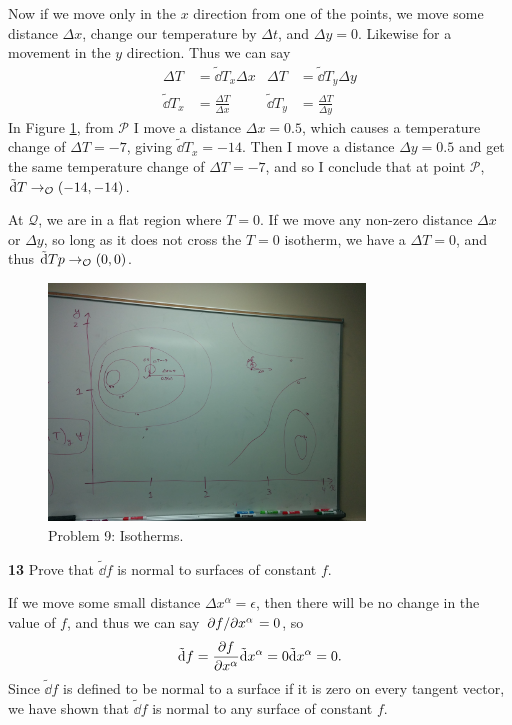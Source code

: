 \documentclass[gr-notes.tex]{subfiles}
\begin{document}
Now if we move only in the $x$ direction from one of the points, we move some distance $\Delta x$, change our temperature by $\Delta t$, and $\Delta y = 0$. Likewise for a movement in the $y$ direction. Thus we can say
%
\begin{align*}
  \Delta T &= \tilde{\dd}T_x \Delta x &
  \Delta T &= \tilde{\dd}T_y \Delta y
  \\
  \tilde{\dd}T_x &= \frac{\Delta T}{\Delta x} &
  \tilde{\dd}T_y &= \frac{\Delta T}{\Delta y}
\end{align*}
%
In Figure \ref{fig:ch3-problem-9}, from $\mathcal{P}$ I move a distance $\Delta x = 0.5$, which causes a temperature change of $\Delta T = -7$, giving $\tilde{\dd}T_x = -14$. Then I move a distance $\Delta y = 0.5$ and get the same temperature change of $\Delta T = -7$, and so I conclude that at point $\mathcal{P}$, $\tilde{\dd}T \to_{\mathcal{O}} (-14, -14)$.

At $\mathcal{Q}$, we are in a flat region where $T = 0$. If we move any non-zero distance $\Delta x$ or $\Delta y$, so long as it does not cross the $T = 0$ isotherm, we have a $\Delta T = 0$, and thus $\tilde{\dd}Tp \to_{\mathcal{O}} (0, 0)$.

\begin{figure}[h]
  \centering
  \includegraphics[width=0.75\textwidth]{img/ch3_problem_9}
  \caption{Problem 9: Isotherms.}
  \label{fig:ch3-problem-9}
\end{figure}


\textbf{13}
Prove that $\tilde{\dd}f$ is normal to surfaces of constant $f$.

If we move some small distance $\Delta x^\alpha = \epsilon$, then there will be no change in the value of $f$, and thus we can say $\pdv*{f}{x^\alpha} = 0$, so
%
\begin{displaymath}
  \tilde{\dd}f =
  \pdv{f}{x^\alpha} \tilde{\dd}x^\alpha =
  0 \tilde{\dd}x^\alpha =
  0.
\end{displaymath}
%
Since $\tilde{\dd}f$ is defined to be normal to a surface if it is zero on every tangent vector, we have shown that $\tilde{\dd}f$ is normal to any surface of constant $f$.
\end{document}
